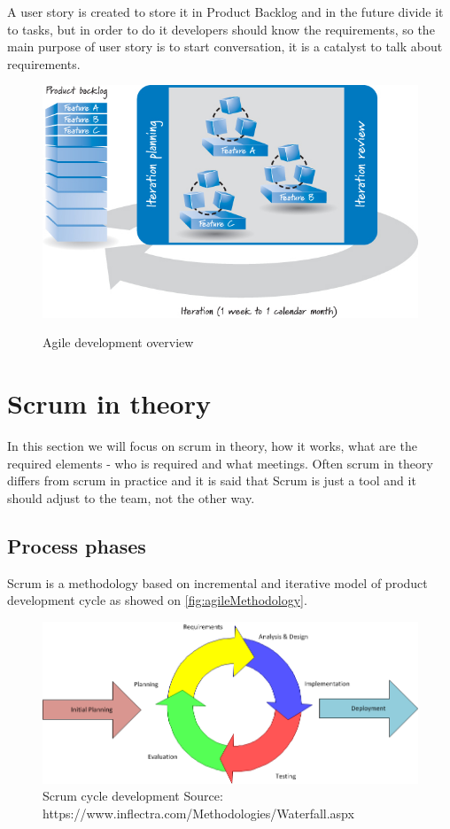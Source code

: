 A user story is created to store it in Product Backlog and in the future divide it to tasks, but in order to do it developers should know the requirements, so the main purpose of user story is to start conversation, it is a catalyst to talk about requirements.

\begin{figure}[h]
\caption{Agile development overview} \cite{ScrumBook}
\label{fig:agileDiagram}
\centering
\includegraphics[width=1\textwidth]{img/agileDiagram}
\end{figure}

\section{Scrum in theory}
In this section we will focus on scrum in theory, how it works, what are the required elements - who is required and what meetings. Often scrum in theory differs from scrum in practice and it is said that Scrum is just a tool and it should adjust to the team, not the other way.
\subsection{Process phases}
Scrum is a methodology based on incremental and iterative model of product development cycle as showed on \autoref{fig:agileMethodology}.

\begin{figure}[h]
\caption{ Scrum cycle development \break Source: https://www.inflectra.com/Methodologies/Waterfall.aspx}
\label{fig:agileMethodology}
\centering
\includegraphics[width=1\textwidth]{img/iterativeScrum}
\end{figure}

